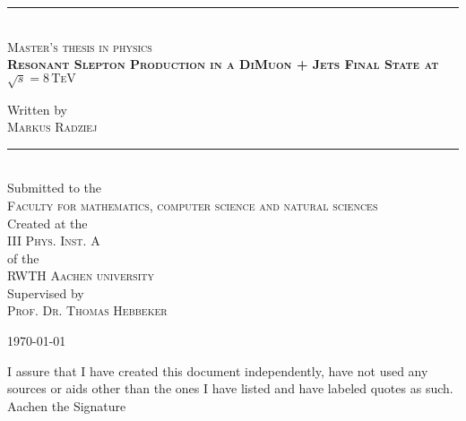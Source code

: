 \documentclass[11pt,a4paper,twoside,openright,DIV=13,BCOR=1cm]{scrbook} %
\numberwithin{equation}{chapter} %
\numberwithin{figure}{chapter} %
\numberwithin{table}{chapter} %
\begin{document}
\pagestyle{empty}

\begin{titlepage}
  \begin{center}
    \vspace{3.0cm}
    
    \rule{\linewidth}{0.5pt} \\
    \textsc{Master's thesis in physics} \\[0.4cm]
    
    \doublespacing
    \textsc{\LARGE \textbf{Resonant Slepton Production in a DiMuon + Jets Final State at $\sqrt{s} = 8\,\text{TeV}$}}\\[1.5cm]
    \singlespacing
    
    Written by\\[0.2cm]
    \textsc{Markus Radziej}\\
    
    
    \rule{\linewidth}{0.5pt} \\[3cm]
    
    
    
    Submitted to the\\
    \textsc{\large Faculty for mathematics, computer science and natural sciences}\\[1.5cm]
    Created at the\\
    \textsc{\large III Phys. Inst. A} \\[0.2cm]
    of the\\
    \textsc{\large RWTH Aachen university} \\[0.5cm]
    
    Supervised by\\
    \textsc{Prof. Dr. Thomas Hebbeker}
    
    \vfill
    {\large \today}
    
  \end{center}
\end{titlepage}

\clearpage{\pagestyle{empty}\cleardoublepage} %


\newpage
\noindent I assure that I have created this document independently, have not used any sources or aids other than the ones I have listed and have labeled quotes as such.\\[1.0cm]
\noindent Aachen the \hfill Signature
\end{document}
